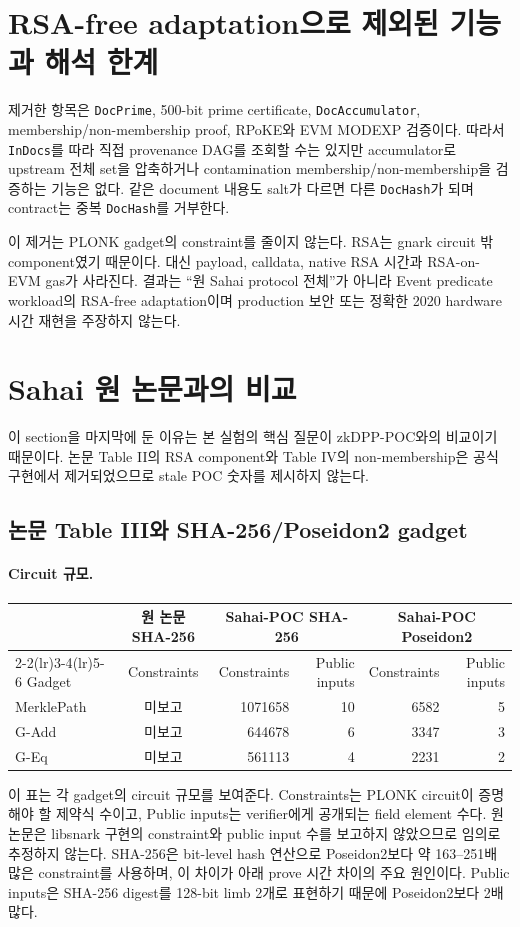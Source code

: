 \documentclass[10pt]{article}
\begin{document}
\section{RSA-free adaptation으로 제외된 기능과 해석 한계}
제거한 항목은 \texttt{DocPrime}, 500-bit prime certificate, \texttt{DocAccumulator}, membership/non-membership proof, RPoKE와 EVM MODEXP 검증이다. 따라서 \texttt{InDocs}를 따라 직접 provenance DAG를 조회할 수는 있지만 accumulator로 upstream 전체 set을 압축하거나 contamination membership/non-membership을 검증하는 기능은 없다. 같은 document 내용도 salt가 다르면 다른 \texttt{DocHash}가 되며 contract는 중복 \texttt{DocHash}를 거부한다.

이 제거는 PLONK gadget의 constraint를 줄이지 않는다. RSA는 gnark circuit 밖 component였기 때문이다. 대신 payload, calldata, native RSA 시간과 RSA-on-EVM gas가 사라진다. 결과는 “원 Sahai protocol 전체”가 아니라 Event predicate workload의 RSA-free adaptation이며 production 보안 또는 정확한 2020 hardware 시간 재현을 주장하지 않는다.
\section{Sahai 원 논문과의 비교}
이 section을 마지막에 둔 이유는 본 실험의 핵심 질문이 zkDPP-POC와의 비교이기 때문이다. 논문 Table II의 RSA component와 Table IV의 non-membership은 공식 구현에서 제거되었으므로 stale POC 숫자를 제시하지 않는다.
\subsection{논문 Table III와 SHA-256/Poseidon2 gadget}
\paragraph{Circuit 규모.}
{\small\setlength{\tabcolsep}{5pt}
\begin{longtable}{lcrrrr}
\toprule & \multicolumn{1}{c}{원 논문 SHA-256} & \multicolumn{2}{c}{Sahai-POC SHA-256} & \multicolumn{2}{c}{Sahai-POC Poseidon2}\\
\cmidrule(lr){2-2}\cmidrule(lr){3-4}\cmidrule(lr){5-6}
Gadget & Constraints & Constraints & Public inputs & Constraints & Public inputs\\
\midrule\endhead
MerklePath & 미보고 & 1071658 & 10 & 6582 & 5\\
G-Add & 미보고 & 644678 & 6 & 3347 & 3\\
G-Eq & 미보고 & 561113 & 4 & 2231 & 2\\
\bottomrule\end{longtable}
}
이 표는 각 gadget의 circuit 규모를 보여준다. Constraints는 PLONK circuit이 증명해야 할 제약식 수이고, Public inputs는 verifier에게 공개되는 field element 수다. 원 논문은 libsnark 구현의 constraint와 public input 수를 보고하지 않았으므로 임의로 추정하지 않는다. SHA-256은 bit-level hash 연산으로 Poseidon2보다 약 163--251배 많은 constraint를 사용하며, 이 차이가 아래 prove 시간 차이의 주요 원인이다. Public inputs은 SHA-256 digest를 128-bit limb 2개로 표현하기 때문에 Poseidon2보다 2배 많다.
\end{document}
